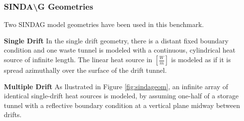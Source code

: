 \begin{frame}[ctb!]
  \frametitle{SINDA{\textbackslash}G Geometries}

Two \gls{SINDAG} model geometries have been used in this benchmark.  

\textbf{Single Drift}
In the single drift geometry, there is a distant fixed boundary condition and 
one waste tunnel is modeled with a continuous, cylindrical heat source of 
infinite length. The linear heat source in $[\frac{W}{m}]$ is modeled as if it 
is spread azimuthally over the surface of the drift tunnel. 

\textbf{Multiple Drift}
As llustrated in Figure \ref{fig:sindageom}, an infinite array of identical single-drift heat sources is modeled,
by assuming one-half of a storage tunnel with a reflective boundary condition at a vertical
plane midway between drifts. 

\end{frame}
